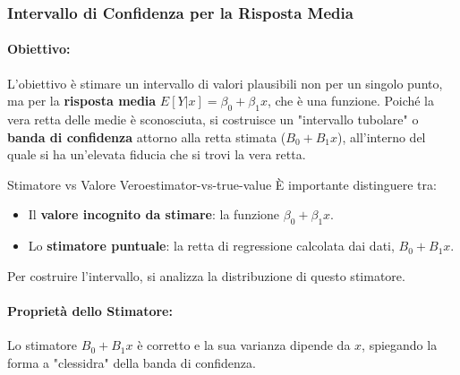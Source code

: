 \subsubsection{Intervallo di Confidenza per la Risposta Media}

\paragraph{Obiettivo:} L'obiettivo è stimare un intervallo di valori plausibili non per un singolo punto, ma per la \textbf{risposta media} \(E[Y|x] = \beta_0 + \beta_1 x\), che è una funzione. Poiché la vera retta delle medie è sconosciuta, si costruisce un "intervallo tubolare" o \textbf{banda di confidenza} attorno alla retta stimata (\(B_0 + B_1x\)), all'interno del quale si ha un'elevata fiducia che si trovi la vera retta.

\begin{nota}{Stimatore vs Valore Vero}{estimator-vs-true-value}
È importante distinguere tra:
\begin{itemize}
    \item Il \textbf{valore incognito da stimare}: la funzione \( \beta_0 + \beta_1 x \).
    \item Lo \textbf{stimatore puntuale}: la retta di regressione calcolata dai dati, \( B_0 + B_1 x \).
\end{itemize}
Per costruire l'intervallo, si analizza la distribuzione di questo stimatore.
\end{nota}

\paragraph{Proprietà dello Stimatore:} Lo stimatore \(B_0 + B_1x\) è corretto e la sua varianza dipende da \(x\), spiegando la forma a "clessidra" della banda di confidenza.

